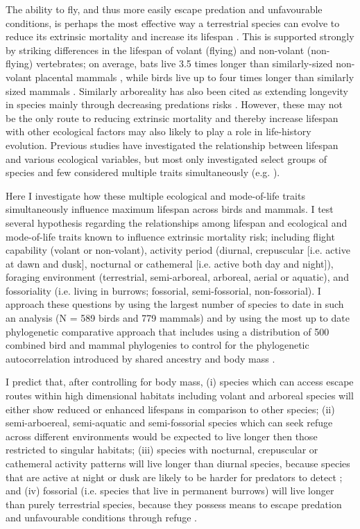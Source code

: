 The ability to fly, and thus more easily escape predation and unfavourable conditions, is perhaps the most effective way a terrestrial species can evolve to reduce its extrinsic mortality and increase its lifespan \citep{partridge1993optimality,holmes1994fly,pomeroy1990fly}. This is supported strongly by striking differences in the lifespan of volant (flying) and non-volant (non-flying) vertebrates; on average, bats live 3.5 times longer than similarly-sized non-volant placental mammals \citep{wilkinson2002life,austad1991mammalian}, while birds live up to four times longer than similarly sized mammals \citep{lindstedt1981body,holmes2003birds}. Similarly arboreality has also been cited as extending longevity in species mainly through decreasing predations risks \citep{shattuck2010arboreality}. However, these may not be the only route to reducing extrinsic mortality and thereby increase lifespan with other ecological factors may also likely to play a role in life-history evolution. Previous studies have investigated the relationship between lifespan and various ecological variables, but most only investigated select groups of species and few considered multiple traits simultaneously (e.g. \cite{shattuck2010arboreality}).

Here I investigate how these multiple ecological and mode-of-life traits simultaneously influence maximum lifespan across birds and mammals. I test several hypothesis regarding the relationships among lifespan and ecological and mode-of-life traits known to influence extrinsic mortality risk; including flight capability (volant or non-volant), activity period (diurnal, crepuscular [i.e. active at dawn and dusk], nocturnal or cathemeral [i.e. active both day and night]), foraging environment (terrestrial, semi-arboreal, arboreal, aerial or aquatic), and fossoriality (i.e. living in burrows; fossorial, semi-fossorial, non-fossorial). I approach these questions by using the largest number of species to date in such an analysis (N =  589 birds and 779 mammals) and by using the most up to date phylogenetic comparative approach that includes using a distribution of 500 combined bird and mammal phylogenies to control for the phylogenetic autocorrelation introduced by shared ancestry \citep{harvey1991comparative} and body mass \citep{lindstedt1981body}.


I predict that, after controlling for body mass, (i) species which can access escape routes within high dimensional habitats including volant and arboreal species will either show reduced or enhanced lifespans in comparison to other species; (ii) semi-arboereal, semi-aquatic and semi-fossorial species which can seek refuge across different environments would be expected to live longer then those restricted to singular habitats; (iii) species with nocturnal, crepuscular or cathemeral activity patterns will live longer than diurnal species, because species that are active at night or dusk are likely to be harder for predators to detect \citep{holmes1994fly,promislow1990living}; and (iv) fossorial (i.e. species that live in permanent burrows) will live longer than purely terrestrial species, because they possess means to escape predation and unfavourable conditions through refuge \citep{buffenstein2002naked}.


